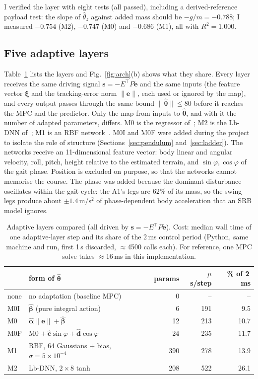 \documentclass[conference]{IEEEtran}
\newcommand{\thetahat}{\hat{\bm\theta}}
\newcommand{\etilde}{\tilde{\bm e}}
\begin{document}
I verified the layer with eight tests (all passed), including a
derived-reference payload test: the slope of $\hat\theta_z$ against
added mass should be $-g/m=-0.788$; I measured $-0.754$ (M2),
$-0.747$ (M0) and $-0.686$ (M1), all with $R^2=1.000$.

\subsection{Five adaptive layers}
Table~\ref{tab:methods} lists the layers and Fig.~\ref{fig:arch}(b)
shows what they share. Every layer receives the same driving signal
$\bm s=-E^\top P\etilde$ and the same inputs (the feature vector
$\bm\xi$ and the tracking-error norm $\|\bm e\|$, each used or ignored
by the map), and every output passes through the same bound
$\|\thetahat\|\le80$ before it reaches the MPC and the predictor. Only
the map from inputs to $\thetahat$, and with it the number of adapted
parameters, differs. M0 is the regressor
of~\cite{sombolestan2024}; M2 is the Lb-DNN of~\cite{patil2022}; M1 is
an RBF network~\cite{lewis1996}. M0I and M0F were added during the
project to isolate the role of structure (Sections~\ref{sec:pendulum}
and~\ref{sec:ladder}). The networks receive an 11-dimensional feature
vector: body linear and angular velocity, roll, pitch, height relative
to the estimated terrain, and $\sin\varphi,\cos\varphi$ of the gait
phase. Position is excluded on purpose, so that the networks cannot
memorise the course. The phase was added because the dominant
disturbance oscillates within the gait cycle: the A1's legs are 62\% of
its mass, so the swing legs produce about $\pm1.4$\,m/s$^2$ of
phase-dependent body acceleration that an SRB model ignores.

\begin{table}[t]
\centering
\caption{Adaptive layers compared (all driven by $\bm s=-E^\top P\etilde$).
Cost: median wall time of one adaptive-layer step and its share of the
2\,ms control period (Python, same machine and run, first 1\,s
discarded, $\approx$4500 calls each). For reference, one MPC solve takes
$\approx$16\,ms in this implementation.}
\label{tab:methods}
\renewcommand{\arraystretch}{1.15}
\setlength{\tabcolsep}{3.5pt}
\begin{tabular}{>{\raggedright}p{0.7cm}>{\raggedright}p{3.15cm}rrr}
\hline
 & form of $\thetahat$ & params & $\mu$s/step & \% of 2\,ms\tabularnewline
\hline
none & no adaptation (baseline MPC) & 0 & -- & --\tabularnewline
M0I & $\hat{\bm\beta}$ (pure integral action) & 6 & 191 & 9.5\tabularnewline
M0 & $\hat{\bm\alpha}\|\bm e\|+\hat{\bm\beta}$ \cite{sombolestan2024} & 12 & 213 & 10.7\tabularnewline
M0F & M0 $+\,\hat{\bm c}\sin\varphi+\hat{\bm d}\cos\varphi$ & 24 & 235 & 11.7\tabularnewline
M1 & RBF, 64 Gaussians + bias, $\sigma=5\times10^{-4}$ \cite{lewis1996} & 390 & 278 & 13.9\tabularnewline
M2 & Lb-DNN, $2\times8$ tanh \cite{patil2022} & 208 & 522 & 26.1\tabularnewline
\hline
\end{tabular}
\end{table}
\end{document}
